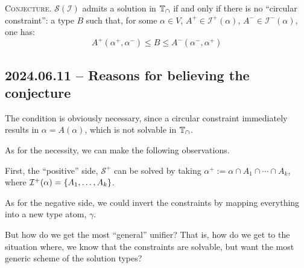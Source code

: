 \documentclass{scrartcl}
\newcommand{\mcS}{\mathcal{S}}
\newcommand{\mcI}{\mathcal{I}}
\begin{document}
\textsc{Conjecture.} $\mcS(\mcI)$ admits a solution in $\mathbb{T}_\cap$ if and only if
there is no ``circular constraint'': a type $B$ such that, for some
$\alpha \in V$, $A^+ \in \mcI^+(\alpha)$, $A^- \in \mcI^-(\alpha)$, one has:
\[ A^+(\alpha^+,\alpha^-) \le B \le A^-(\alpha^-,\alpha^+) \]

\subsection*{2024.06.11 -- Reasons for believing the conjecture}

The condition is obviously necessary, since a circular constraint immediately
results in $\alpha = A(\alpha)$, which is not solvable in $\mathbb{T}_\cap$.

As for the necessity, we can make the following observations.

First, the ``positive'' side, $\mcS^+$ can be solved by taking
$\alpha^+ := \alpha \cap A_1 \cap \cdots \cap A_k$, where $\mcI^+(\alpha) = \setof{A_1,\dots,A_k}$.

As for the negative side, we could invert the constraints by mapping everything into
a new type atom, $\gamma$.

But how do we get the most ``general'' unifier?  That is, how do we get to the situation
where, we know that the constraints are solvable, but want the most generic scheme
of the solution types?
\end{document}
